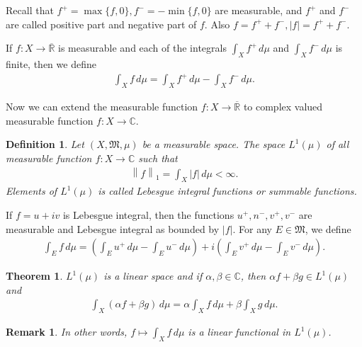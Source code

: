 \documentclass[11pt]{book}
\newtheorem{definition}{Definition}[chapter]
\newtheorem{theorem}{Theorem}[chapter]
\newtheorem{remark}{Remark}[chapter]
\theoremstyle{definition}
\numberwithin{equation}{chapter}
\begin{document}
\medskip

Recall that $f^+ = \max\{f,0\}, f^- = - \min\{f,0\}$ are measurable, and $f^+$ and $f^-$ are called positive part and negative part of $f$. Also $f = f^+ + f^-, \left|f\right| = f^+ + f^-$.

If $f: X \to \overline{\mathbb{R}}$ is measurable and each of the integrals $\int_X f^+\,d\mu$ and $\int_X f^-\,d\mu$ is finite, then we define
\begin{align*}
    \int_X f\,d\mu = \int_X f^+\,d\mu - \int_X f^-\,d\mu.
\end{align*}

\medskip

Now we can extend the measurable function $f:X \to \overline{\mathbb{R}}$ to complex valued measurable function $f: X \to \mathbb{C}$.

\medskip

\begin{definition}\label{def_27}
Let $(X,\mathfrak{M},\mu)$ be a measurable space. The space $L^1(\mu)$ of all measurable function $f: X \to \mathbb{C}$ such that
\begin{align*}
    \left\|f\right\|_1 = \int_X \left|f\right|\,d\mu < \infty.
\end{align*}
Elements of $L^1(\mu)$ is called Lebesgue integral functions or summable functions.
\end{definition}

\medskip

If $f = u + iv$ is Lebesgue integral, then the functions $u^+, n^-, v^+, v^-$ are measurable and Lebesgue integral as bounded by $\left|f\right|$. For any $E \in \mathfrak{M}$, we define
\begin{align*}
    \int_E f\,d\mu = \left(\int_E u^+\,d\mu - \int_E u^-\,d\mu\right) + i \left(\int_E v^+\,d\mu - \int_E v^-\,d\mu\right).
\end{align*}

\medskip

\begin{theorem}
$L^1(\mu)$ is a linear space and if $\alpha,\beta \in \mathbb{C}$, then $\alpha f + \beta g \in L^1(\mu)$ and
\begin{align*}
    \int_X (\alpha f + \beta g)\,d\mu = \alpha \int_X f\,d\mu + \beta \int_X g\,d\mu.
\end{align*}
\end{theorem}

\medskip

\begin{remark}
In other words, $f \mapsto \int_X f\,d\mu$ is a linear functional in $L^1(\mu)$.
\end{remark}
\end{document}
